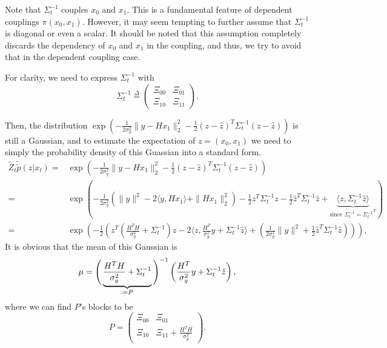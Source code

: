 \begin{remark}
    Note that $\Sigma_t^{-1}$ couples $x_0$ and $x_1$. This is a fundamental feature of dependent couplings $\pi(x_0,x_1)$. However, it may seem tempting to further assume that $\Sigma_t^{-1}$ is diagonal or even a scalar. It should be noted that this assumption completely discards the dependency of $x_0$ and $x_1$ in the coupling, and thus, we try to avoid that in the dependent coupling case.
\end{remark}

For clarity, we need to express $\Sigma_t^{-1}$ with 
\begin{equation}
    \Sigma_t^{-1} \overset{\Delta}{=} \begin{pmatrix}
        \Xi_{00} & \Xi_{01} \\
        \Xi_{10} & \Xi_{11}
    \end{pmatrix}.
\end{equation}

Then, the distribution $\exp\left(-\frac{1}{2\sigma_y^2}\|y-Hx_1\|^2_2 - \frac{1}{2}(z-\hat{z})^T\Sigma_t^{-1}(z-\hat{z})\right)$ is still a Gaussian, and to estimate the expectation of $z=(x_0,x_1)$ we need to simply the probability density of this Guassian into a standard form.
\begin{align}
    \nonumber {\tilde{Z}_t}\tilde{\tilde{p}}(z|x_t) = &\exp\left(-\frac{1}{2\sigma_y^2}\|y-Hx_1\|^2_2 - \frac{1}{2}(z-\hat{z})^T\Sigma_t^{-1}(z-\hat{z})\right) \\
    \nonumber =&\exp\left(-\frac{1}{2\sigma_y^2}
    \left(
        \|y\|^2- 2\langle y, Hx_1 \rangle + \|Hx_1\|^2_2
    \right)
    -
    \frac{1}{2}z^T\Sigma_t^{-1}z - \frac{1}{2}\hat{z}^T{\Sigma_t^{-1}}\hat{z} + \underbrace{\langle z,\Sigma_t^{-1} \hat{z} \rangle}_{\text{since } \Sigma_t^{-1} = {\Sigma_t^{-1}}^T}\right) \\
    =&\exp\left(-\frac{1}{2}\left(
        z^T\left(\frac{H^TH}{\sigma_y^2} + \Sigma_t^{-1}\right)z
        -2\langle
            z, \frac{H^T}{\sigma_y^2}y + \Sigma_t^{-1}\hat{z}
        \rangle
        +\left(
            \frac{1}{2\sigma_y^2}\|y\|^2 + \frac{1}{2}\hat{z}^T{\Sigma_t^{-1}}\hat{z}
        \right)
        \right)
    \right),
\end{align}
It is obvious that the mean of this Gaussian is
\begin{equation}
    \mu = \Bigg{(}\underbrace{\frac{H^TH}{\sigma_y^2} + \Sigma_t^{-1}}_{\coloneqq P}\Bigg{)}^{-1}
    \left(
    \frac{H^T}{\sigma_y^2}y + \Sigma_t^{-1}\hat{z}
    \right),
\end{equation}
where we can find $P$'s blocks to be 
\begin{equation}
    P = \begin{pmatrix}
        \Xi_{00} & \Xi_{01} \\
        \Xi_{10} & \Xi_{11} + \frac{H^TH}{\sigma_y^2}
    \end{pmatrix}.
\end{equation}

